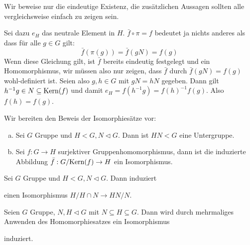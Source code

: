 \begin{beweis}
  Wir beweise nur die eindeutige Existenz, die zusätzlichen Aussagen sollten alle vergleichsweise einfach zu zeigen sein.

  Sei dazu \(e_H\) das neutrale Element in \(H\).
  \(\bar{f} \circ \pi=f\) bedeutet ja nichts anderes als dass für alle \(g\in G\) gilt:
  \[\bar{f}(\pi(g))=\bar{f}(gN)=f(g)\]
  Wenn diese Gleichung gilt, ist \(\bar{f}\) bereits eindeutig festgelegt und ein Homomorphismus, wir müssen also nur zeigen, dass \(\bar{f}\) durch \(\bar{f}(gN)=f(g)\) wohl-definiert ist. Seien also \(g,h\in G\) mit \(gN=hN\) gegeben. Dann gilt \(h^{-1}g\in N\subseteq \mathrm{Kern}(f)\) und damit \(e_H=f(h^{-1}g)=f(h)^{-1}f(g)\). Also \(f(h)=f(g)\).
\end{beweis}

Wir bereiten den Beweis der Isomorphiesätze vor:

\begin{lemma}
  \begin{enumerate}[(a)]
  \item Sei \(G\) Gruppe und \(H< G, N\triangleleft G\).
    Dann ist \(HN<G\) eine Untergruppe.
  \item Sei \(f:G\to H\) surjektiver Gruppenhomomorphismus, dann ist die induzierte Abbildung \(\bar{f}:G/\mathrm{Kern}(f)\to H\) ein Isomorphismus.
  \end{enumerate}
\end{lemma}

\begin{satz}[1. Isomorphiesatz]
  Sei \(G\) Gruppe und \(H< G, N\triangleleft G\). Dann induziert
  \begin{center}
  \end{center}
  einen Isomorphismus \(H/H\cap N\to HN/N\).
\end{satz}

\begin{satz}[2. Isomorphiesatz]
  Seien \(G\) Gruppe, \(N,H\triangleleft G\) mit \(N\subseteq H\subseteq G\).
  Dann wird durch mehrmaliges Anwenden des Homomorphiesatzes ein Isomorphismus
  \begin{center}
  \end{center}
  induziert.
\end{satz}

